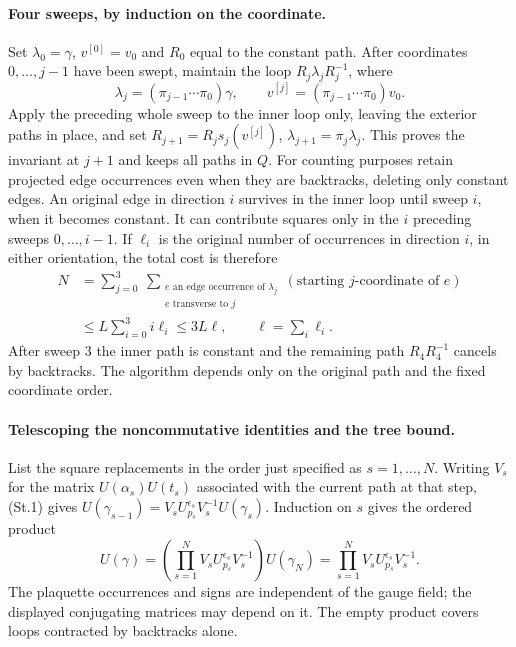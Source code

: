 \documentclass[11pt,a4paper]{article}
\theoremstyle{plain}
\theoremstyle{definition}
\theoremstyle{remark}
\numberwithin{equation}{section}
\begin{document}
\paragraph{Four sweeps, by induction on the coordinate.}
Set $\lambda_0=\gamma$, $v^{[0]}=v_0$ and $R_0$ equal to the constant path.
After coordinates $0,\ldots,j-1$ have been swept, maintain the loop
$R_j\lambda_j R_j^{-1}$, where
\[
\lambda_j=(\pi_{j-1}\cdots\pi_0)\gamma,\qquad
v^{[j]}=(\pi_{j-1}\cdots\pi_0)v_0.
\]
Apply the preceding whole sweep to the inner loop only, leaving the exterior paths in place, and set
$R_{j+1}=R_js_j(v^{[j]})$, $\lambda_{j+1}=\pi_j\lambda_j$.
This proves the invariant at $j+1$ and keeps all paths in $Q$.
For counting purposes retain projected edge occurrences even when they are backtracks, deleting only constant edges.
An original edge in direction $i$ survives in the inner loop until sweep $i$, when it becomes constant.
It can contribute squares only in the $i$ preceding sweeps $0,\ldots,i-1$.
If $\ell_i$ is the original number of occurrences in direction $i$, in either orientation, the total cost is therefore
\begin{equation*}\tag{St.2}\label{eq:St-count}
\begin{aligned}
N&=\sum_{j=0}^3\ \sum_{\substack{e\text{ an edge occurrence of }\lambda_j\\e\text{ transverse to }j}}
          (\text{starting }j\text{-coordinate of }e)\\
 &\le L\sum_{i=0}^3i\ell_i\le3L\ell,\qquad \ell=\sum_i\ell_i.
\end{aligned}
\end{equation*}
After sweep $3$ the inner path is constant and the remaining path $R_4R_4^{-1}$ cancels by backtracks.
The algorithm depends only on the original path and the fixed coordinate order.

\paragraph{Telescoping the noncommutative identities and the tree bound.}
List the square replacements in the order just specified as $s=1,\ldots,N$.
Writing $V_s$ for the matrix $U(\alpha_s)U(t_s)$ associated with the current path at that step, (St.1) gives
$U(\gamma_{s-1})=V_sU_{p_s}^{\epsilon_s}V_s^{-1}U(\gamma_s)$.
Induction on $s$ gives the ordered product
\[
U(\gamma)=\left(\prod_{s=1}^N V_sU_{p_s}^{\epsilon_s}V_s^{-1}\right)U(\gamma_N)
=\prod_{s=1}^N V_sU_{p_s}^{\epsilon_s}V_s^{-1}.
\]
The plaquette occurrences and signs are independent of the gauge field; the displayed conjugating matrices may depend on it.
The empty product covers loops contracted by backtracks alone.
\end{document}
